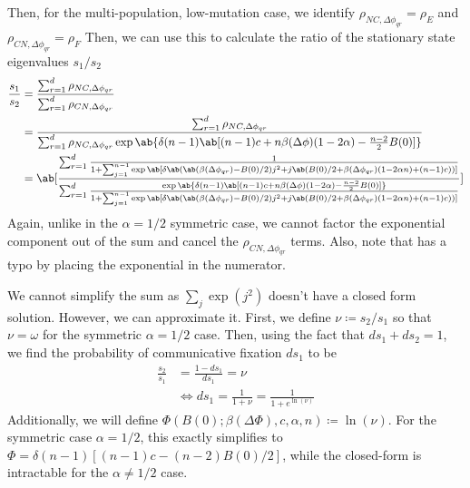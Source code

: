 \documentclass[pdflatex,lineno,referee,sn-mathphys-ay]{class/sn-jnl}
\begin{document}
Then, for the multi-population, low-mutation case, we identify
$\rho_{NC,\Delta \phi_{qr}} = \rho_E$ and $\rho_{CN,\Delta \phi_{qr}} = \rho_F$
Then, we can use this to calculate the ratio of the stationary state
eigenvalues $s_1/s_2$
\begin{align*}
  \frac{s_1}{s_2} &= \frac{\sum_{r=1}^{d} \rho_{NC,\Delta \phi_{qr}} }
  {\sum_{r=1}^{d} \rho_{CN,\Delta \phi_{qr}}} \\
                  &= \frac{\sum_{r=1}^{d} \rho_{NC,\Delta \phi_{qr}}
                  }
  {\sum_{r=1}^{d} \rho_{NC,\Delta \phi_{qr}}
                \exp \ab\{
                \delta (n-1)
                \ab[
                (n-1) c + n \beta(\Delta\phi) (1 - 2 \alpha)
                - \frac{n-2}{2} B(0)
                 ]
                 \}
               }
               \\
      &=
      \ab[
\frac
{\sum_{r=1}^{d}
  \frac{1}{1+\sum_{j=1}^{n-1} \exp\ab[\delta \ab(
           \ab(\beta(\Delta\phi_{qr}) - B(0)/2) j^2
           + j \ab(B(0)/2 + \beta(\Delta\phi_{qr}) (1 - 2 \alpha n)  + (n-1) c))]}
                  }
{\sum_{r=1}^{d}
  \frac{\exp \ab\{
                \delta (n-1)
                \ab[
                (n-1) c + n \beta(\Delta\phi) (1 - 2 \alpha)
                - \frac{n-2}{2} B(0)
                 ]
                 \}
}{1+\sum_{j=1}^{n-1} \exp\ab[\delta \ab(
           \ab(\beta(\Delta\phi_{qr}) - B(0)/2) j^2
           + j \ab(B(0)/2 + \beta(\Delta\phi_{qr}) (1 - 2 \alpha n)  +
         (n-1) c))]}
                               }
                               ]
\end{align*}
Again, unlike in the $\alpha = 1/2$ symmetric case, we cannot factor the
exponential component out of the sum and cancel the $\rho_{CN,\Delta
\phi_{qr}}$ terms.
Also, note that \cite{tripp2022evolutionary} has a typo by placing the
exponential in the numerator.

We cannot simplify the sum as $\sum_j \exp(j^2)$ doesn't have a closed form solution.
However, we can approximate it.
First, we define $\nu \coloneqq s_2/s_1$ so that $\nu = \omega$ for the
symmetric $\alpha = 1/2$ case.
Then, using the fact that $d s_1 + d s_2 = 1$, we find the probability
of communicative fixation $d s_1$ to be
\begin{equation}
  \begin{aligned}
    \frac{s_2}{s_1} &= \frac{1 - d s_1}{d s_1} = \nu \\
                    &\iff d s_1 = \frac{1}{1+\nu} =
                    \frac{1}{1+e^{\ln(\nu)}}
  \end{aligned}
\end{equation}
Additionally, we will define $\Phi(B(0);\beta(\Delta\Phi),c,\alpha,n)
\coloneqq \ln(\nu)$.
For the symmetric case $\alpha=1/2$, this exactly simplifies to $\Phi =
\delta(n-1)[(n-1)c - (n-2)B(0)/2]$, while the closed-form is intractable
for the $\alpha \neq 1/2$ case.
\end{document}
